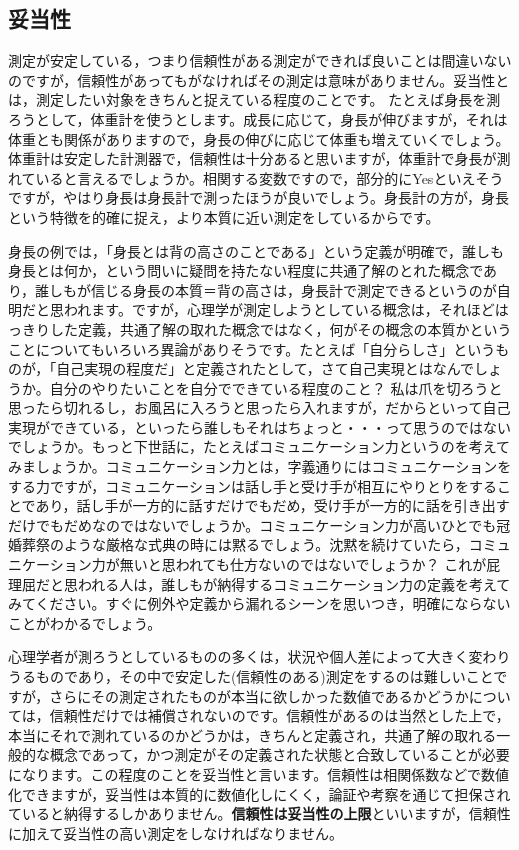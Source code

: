 \documentclass{ltjbook}
\begin{document}
\subsection{妥当性}
測定が安定している，つまり信頼性がある測定ができれば良いことは間違いないのですが，信頼性があってもがなければその測定は意味がありません。妥当性とは，測定したい対象をきちんと捉えている程度のことです。
たとえば身長を測ろうとして，体重計を使うとします。成長に応じて，身長が伸びますが，それは体重とも関係がありますので，身長の伸びに応じて体重も増えていくでしょう。体重計は安定した計測器で，信頼性は十分あると思いますが，体重計で身長が測れていると言えるでしょうか。相関する変数ですので，部分的にYesといえそうですが，やはり身長は身長計で測ったほうが良いでしょう。身長計の方が，身長という特徴を的確に捉え，より本質に近い測定をしているからです。

身長の例では，「身長とは背の高さのことである」という定義が明確で，誰しも身長とは何か，という問いに疑問を持たない程度に共通了解のとれた概念であり，誰しもが信じる身長の本質＝背の高さは，身長計で測定できるというのが自明だと思われます。ですが，心理学が測定しようとしている概念は，それほどはっきりした定義，共通了解の取れた概念ではなく，何がその概念の本質かということについてもいろいろ異論がありそうです。たとえば「自分らしさ」というものが，「自己実現の程度だ」と定義されたとして，さて自己実現とはなんでしょうか。自分のやりたいことを自分でできている程度のこと？ 私は爪を切ろうと思ったら切れるし，お風呂に入ろうと思ったら入れますが，だからといって自己実現ができている，といったら誰しもそれはちょっと・・・って思うのではないでしょうか。もっと下世話に，たとえばコミュニケーション力というのを考えてみましょうか。コミュニケーション力とは，字義通りにはコミュニケーションをする力ですが，コミュニケーションは話し手と受け手が相互にやりとりをすることであり，話し手が一方的に話すだけでもだめ，受け手が一方的に話を引き出すだけでもだめなのではないでしょうか。コミュニケーション力が高いひとでも冠婚葬祭のような厳格な式典の時には黙るでしょう。沈黙を続けていたら，コミュニケーション力が無いと思われても仕方ないのではないでしょうか？ これが屁理屈だと思われる人は，誰しもが納得するコミュニケーション力の定義を考えてみてください。すぐに例外や定義から漏れるシーンを思いつき，明確にならないことがわかるでしょう。

心理学者が測ろうとしているものの多くは，状況や個人差によって大きく変わりうるものであり，その中で安定した(信頼性のある)測定をするのは難しいことですが，さらにその測定されたものが本当に欲しかった数値であるかどうかについては，信頼性だけでは補償されないのです。信頼性があるのは当然とした上で，本当にそれで測れているのかどうかは，きちんと定義され，共通了解の取れる一般的な概念であって，かつ測定がその定義された状態と合致していることが必要になります。この程度のことを妥当性と言います。信頼性は相関係数などで数値化できますが，妥当性は本質的に数値化しにくく，論証や考察を通じて担保されていると納得するしかありません。\textbf{信頼性は妥当性の上限}といいますが，信頼性に加えて妥当性の高い測定をしなければなりません。
\end{document}
